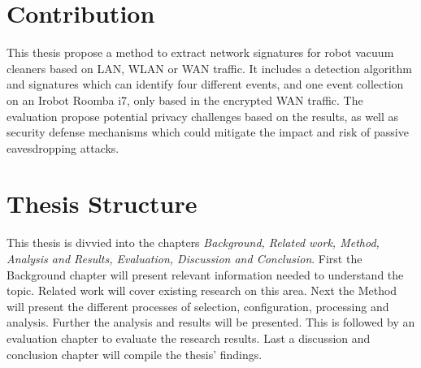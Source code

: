 \section{Contribution}
This thesis propose a method to extract network signatures for robot vacuum cleaners based on LAN, WLAN or WAN traffic. It includes a detection algorithm and signatures which can identify four different events, and one event collection on an Irobot Roomba i7, only based in the encrypted WAN traffic. The evaluation propose potential privacy challenges based on the results, as well as security defense mechanisms which could mitigate the impact and risk of passive eavesdropping attacks. 

\section{Thesis Structure}
This thesis is divvied into the chapters \textit{Background, Related work, Method, Analysis and Results, Evaluation, Discussion and Conclusion}. First the Background chapter will present relevant information needed to understand the topic. Related work will cover existing research on this area. Next the Method will present the different processes of selection, configuration, processing and analysis. Further the analysis and results will be presented. This is followed by an evaluation chapter to evaluate the research results. Last a discussion and conclusion chapter will compile the thesis' findings. 



